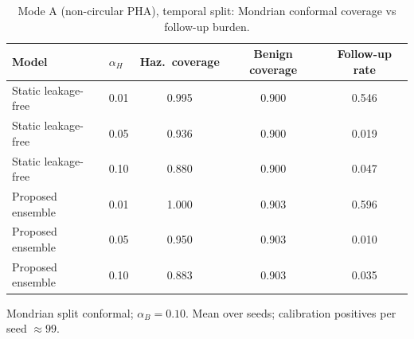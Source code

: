 \begin{table}[t]
\centering
\small
\caption{Mode A (non-circular PHA), temporal split: Mondrian conformal coverage vs follow-up burden.}
\label{tab:conf_pha_temporal}
\begin{tabular}{llccc}
\toprule
Model & $\alpha_H$ & Haz.\ coverage & Benign coverage & Follow-up rate \\
\midrule
Static leakage-free & 0.01 & 0.995 & 0.900 & 0.546 \\
Static leakage-free & 0.05 & 0.936 & 0.900 & 0.019 \\
Static leakage-free & 0.10 & 0.880 & 0.900 & 0.047 \\
\midrule
Proposed ensemble & 0.01 & 1.000 & 0.903 & 0.596 \\
Proposed ensemble & 0.05 & 0.950 & 0.903 & 0.010 \\
Proposed ensemble & 0.10 & 0.883 & 0.903 & 0.035 \\
\bottomrule
\end{tabular}
\par\vspace{2pt}\footnotesize Mondrian split conformal; $\alpha_B=0.10$. Mean over seeds; calibration positives per seed $\approx 99$.
\end{table}
